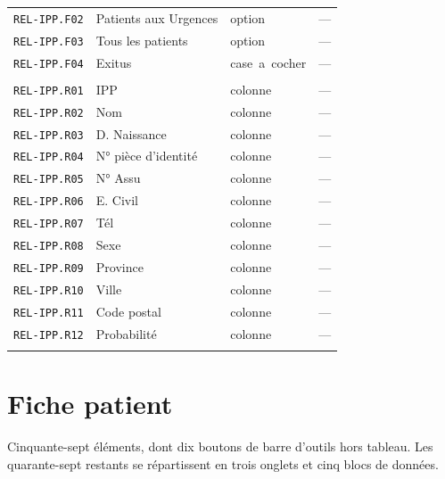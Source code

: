 \begin{longtable}{@{}p{2.9cm}p{3.9cm}p{2.8cm}p{4.0cm}@{}}
\texttt{REL-IPP.F02} & Patients aux Urgences & option & — \\
\texttt{REL-IPP.F03} & Tous les patients & option & — \\
\texttt{REL-IPP.F04} & Exitus & case\ a\ cocher & — \\
\addlinespace
\multicolumn{4}{@{}l}{\textbf{Colonnes de résultat}} \\
\texttt{REL-IPP.R01} & IPP & colonne & — \\
\texttt{REL-IPP.R02} & Nom & colonne & — \\
\texttt{REL-IPP.R03} & D. Naissance & colonne & — \\
\texttt{REL-IPP.R04} & N° pièce d'identité & colonne & — \\
\texttt{REL-IPP.R05} & N° Assu & colonne & — \\
\texttt{REL-IPP.R06} & E. Civil & colonne & — \\
\texttt{REL-IPP.R07} & Tél & colonne & — \\
\texttt{REL-IPP.R08} & Sexe & colonne & — \\
\texttt{REL-IPP.R09} & Province & colonne & — \\
\texttt{REL-IPP.R10} & Ville & colonne & — \\
\texttt{REL-IPP.R11} & Code postal & colonne & — \\
\texttt{REL-IPP.R12} & Probabilité & colonne & — \\
\addlinespace
\bottomrule
\end{longtable}

\section{Fiche patient}

Cinquante-sept éléments, dont dix boutons de barre d'outils hors tableau. Les quarante-sept
restants se répartissent en trois onglets et cinq blocs de données.

